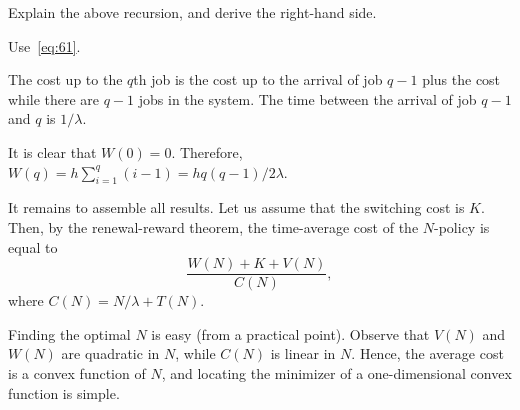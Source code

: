 \begin{exercise}
Explain the above recursion, and derive the right-hand side.
\begin{hint}
  Use~\cref{eq:61}.
\end{hint}
\begin{solution}
  The cost up to the $q$th job is the cost up to the arrival of job $q-1$ plus the cost while there are $q-1$ jobs in the system.
  The time between the arrival of job $q-1$ and $q$ is $1/\lambda$.

  It is clear that $W(0)=0$. Therefore, $W(q) = h\sum_{i=1}^q (i-1) = hq(q-1)/2\lambda$. 
\end{solution}
\end{exercise}

It remains to assemble all results. Let us assume that the switching cost is $K$. Then, by the renewal-reward theorem, the time-average cost of the $N$-policy is equal to
\begin{equation*}
  \frac{W(N)+K+V(N)}{C(N)},
\end{equation*}
where $C(N) = N/\lambda + T(N)$.

Finding the optimal $N$ is easy (from a practical point).
Observe that $V(N)$ and $W(N)$ are quadratic in $N$, while $C(N)$ is linear in $N$.
Hence, the average cost is a convex function of $N$, and locating the minimizer of a one-dimensional convex function is simple.






